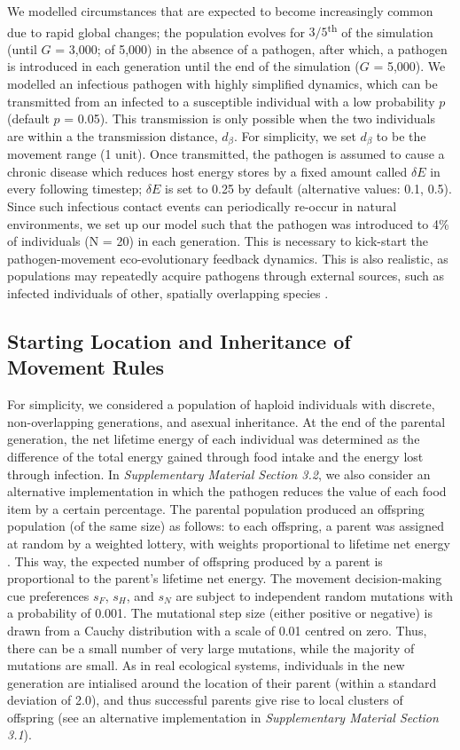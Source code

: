 We modelled circumstances that are expected to become increasingly common due to rapid global changes; the population evolves for $3/5$\textsuperscript{th} of the simulation (until $G$ = 3,000; of 5,000) in the absence of a pathogen, after which, a pathogen is introduced in each generation until the end of the simulation ($G$ = 5,000).
We modelled an infectious pathogen with highly simplified dynamics, which can be transmitted from an infected to a susceptible individual with a low probability $p$ (default $p$ = 0.05).
This transmission is only possible when the two individuals are within a the transmission distance, $d_\beta$.
For simplicity, we set $d_\beta$ to be the movement range (1 unit).
Once transmitted, the pathogen is assumed to cause a chronic disease which reduces host energy stores by a fixed amount called $\delta E$ in every following timestep; $\delta E$ is set to 0.25 by default (alternative values: 0.1, 0.5).
Since such infectious contact events can periodically re-occur in natural environments, we set up our model such that the pathogen was introduced to 4\% of individuals (N = 20) in each generation.
This is necessary to kick-start the pathogen-movement eco-evolutionary feedback dynamics.
This is also realistic, as populations may repeatedly acquire pathogens through external sources, such as infected individuals of other, spatially overlapping species \citep[e.g.][]{kuchipudi2022}.

\subsection*{Starting Location and Inheritance of Movement Rules}

For simplicity, we considered a population of haploid individuals with discrete, non-overlapping generations, and asexual inheritance.
At the end of the parental generation, the net lifetime energy of each individual was determined as the difference of the total energy gained through food intake and the energy lost through infection. 
In \textit{Supplementary Material Section 3.2}, we also consider an alternative implementation in which the pathogen reduces the value of each food item by a certain percentage.
The parental population produced an offspring population (of the same size) as follows: to each offspring, a parent was assigned at random by a weighted lottery, with weights proportional to lifetime net energy \citep{netz2021, gupte2021a}.
This way, the expected number of offspring produced by a parent is proportional to the parent's lifetime net energy.
The movement decision-making cue preferences $s_F$, $s_H$, and $s_N$ are subject to independent random mutations with a probability of 0.001.
The mutational step size (either positive or negative) is drawn from a Cauchy distribution with a scale of 0.01 centred on zero.
Thus, there can be a small number of very large mutations, while the majority of mutations are small.
As in real ecological systems, individuals in the new generation are intialised around the location of their parent (within a standard deviation of 2.0), and thus successful parents give rise to local clusters of offspring (see an alternative implementation in \textit{Supplementary Material Section 3.1}).

